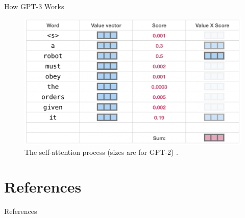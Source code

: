\documentclass{beamer}
\begin{document}
\begin{frame}{How GPT-3 Works}
    \begin{figure}
        \centering
        \includegraphics[scale=0.35]{gpt3_self_attention2}
        \caption{The self-attention process (sizes are for GPT-2) \cite{alammar2019}.}
        \label{fig:gpt3_self_attention2}
    \end{figure}
\end{frame}

\section{References}

\begin{frame}[allowframebreaks]{References}
    \nocite{*}
    \printbibliography
\end{frame}
\end{document}
